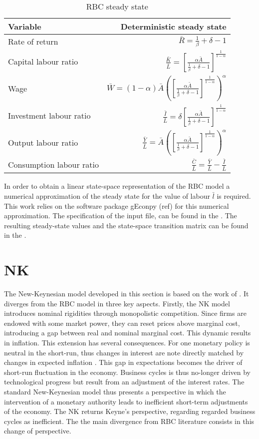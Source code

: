 \documentclass[12pt,a4paper,english]{article} %
\newcommand{\Rss}{\frac{1}{\beta} + \delta - 1}
\newcommand{\Ass}{\bar{A}}
\newcommand{\KLss}{\left[ \frac{\alpha \Ass}{\Rss} \right]^{\frac{1}{1-\alpha}}}
\let\oldsection\section
\renewcommand\section{\clearpage\oldsection}
\begin{document}
	\begin{table}[H]
		\fontsize{9pt}{9pt}\selectfont
		\centering
		\caption{RBC steady state}
		\begin{tabular}{lr}
			\textbf{Variable} & \textbf{Deterministic steady state}\\
			\hline 
			Rate of return & $\bar{R} = \Rss$ \\
			Capital labour ratio & $\frac{\bar{K}}{\bar{L}} = \KLss$ \\
			Wage & $\bar{W} = (1 - \alpha) \Ass \left(\KLss\right)^\alpha$ \\
			Investment labour ratio & $\frac{\bar{I}}{\bar{L}} = \delta \KLss$ \\
			Output labour ratio & $\frac{\bar{Y}}{\bar{L}} = \Ass \left(\KLss\right)^\alpha$ \\
			Consumption labour ratio & $\frac{\bar{C}}{\bar{L}} = \frac{\bar{Y}}{\bar{L}} - \frac{\bar{I}}{\bar{L}}$ \\
		\end{tabular}
	\end{table}

	In order to obtain a linear state-space representation of the RBC model a numerical approximation of the steady state for the value of labour $\bar{l}$ is required. This work relies on the software package gEconpy (ref) for this numerical approximation. The specification of the input file, can be found in the . The resulting steady-state values and the state-space transition matrix can be found in the . 

	\section{NK} \label{sec:NK}
	The New-Keynesian model developed in this section is based on the work of \cite{gali_monetary_2008}. It diverges from the RBC model in three key aspects.
	Firstly, the NK model introduces nominal rigidities through monopolistic competition. Since firms are endowed with some market power, they can reset prices above marginal cost, introducing a gap between real and nominal marginal cost. This dynamic results in inflation. This extension has several consequences. For one monetary policy is neutral in the short-run, thus changes in interest are note directly matched by changes in expected inflation \cite{gali_monetary_2008}. This gap in expectations becomes the driver of short-run fluctuation in the economy. Business cycles is thus no-longer driven by technological progress but result from an adjustment of the interest rates. The standard New-Keynesian model thus presents a perspective in which the intervention of a monetary authority leads to inefficient short-term adjustments of the economy. The NK returns Keyne's perspective, regarding regarded business cycles as inefficient. The the main divergence from RBC literature consists in this change of perspective.
	
\end{document}
